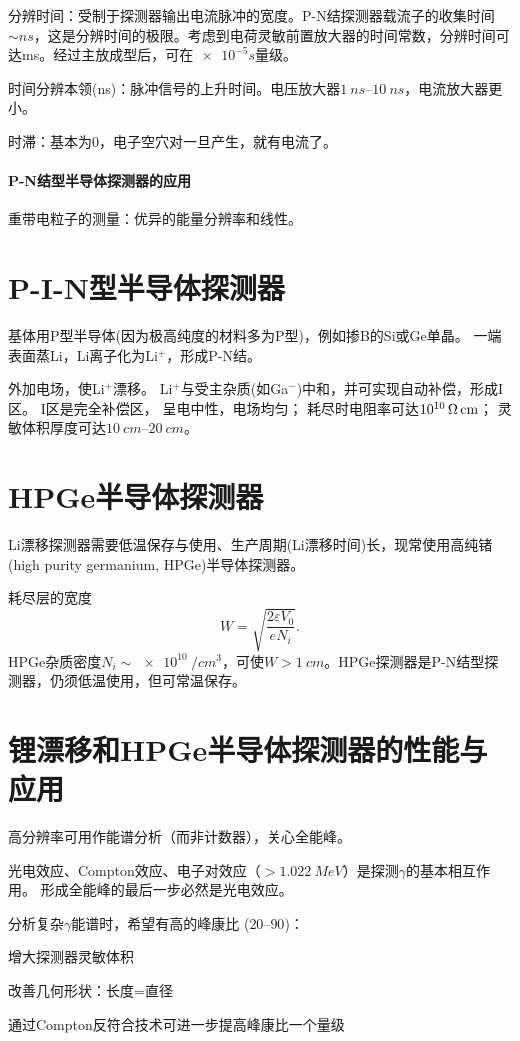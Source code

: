 \begin{compactitem}
	\item 分辨时间：受制于探测器输出电流脉冲的宽度。P-N结探测器载流子的收集时间$\sim\si{ns}$，这是分辨时间的极限。考虑到电荷灵敏前置放大器的时间常数，分辨时间可达ms。经过主放成型后，可在$\SI{e-5}s$量级。
	\item 时间分辨本领(ns)：脉冲信号的上升时间。电压放大器$\SIrange{1}{10}{ns}$，电流放大器更小。
	\item 时滞：基本为0，电子空穴对一旦产生，就有电流了。
\end{compactitem}
\iffalse
\begin{compactenum}
	\item 
\end{compactenum}
\begin{compactitem}
	\item 
\end{compactitem}
\fi

\paragraph{P-N结型半导体探测器的应用}
重带电粒子的测量：优异的能量分辨率和线性。

\section{P-I-N型半导体探测器}

基体用P型半导体(因为极高纯度的材料多为P型)，例如掺B的Si或Ge单晶。
一端表面蒸Li，Li离子化为Li$^+$，形成P-N结。

外加电场，使Li$^+$漂移。
Li$^+$与受主杂质(如Ga$^-$)中和，并可实现自动补偿，形成I区。
I区是完全补偿区，
呈电中性，电场均匀；
耗尽时电阻率可达$\SI{E10}{\ohm.cm}$；
灵敏体积厚度可达$\SIrange{10}{20}{cm}$。

\section{HPGe半导体探测器}

Li漂移探测器需要低温保存与使用、生产周期(Li漂移时间)长，现常使用高纯锗(high purity germanium, HPGe)半导体探测器。%

耗尽层的宽度
\[
	W=\sqrt{\frac{2\varepsilon V_0}{eN_i}}.
\]
HPGe杂质密度$N_i\sim\SI{e10}{/cm^3}$，可使$W>\SI{1}{cm}$。HPGe探测器是P-N结型探测器，仍须低温使用，但可常温保存。

\section{锂漂移和HPGe半导体探测器的性能与应用}

高分辨率可用作能谱分析（而非计数器），关心全能峰。

光电效应、Compton效应、电子对效应（$>\SI{1.022}{MeV}$）是探测$\gamma$的基本相互作用。
形成全能峰的最后一步必然是光电效应。

分析复杂$\gamma$能谱时，希望有高的峰康比
($\numrange{20}{90}$)：
\begin{compactenum}
	\item 增大探测器灵敏体积
	\item 改善几何形状：长度=直径
	\item 通过Compton反符合技术可进一步提高峰康比一个量级
\end{compactenum}

